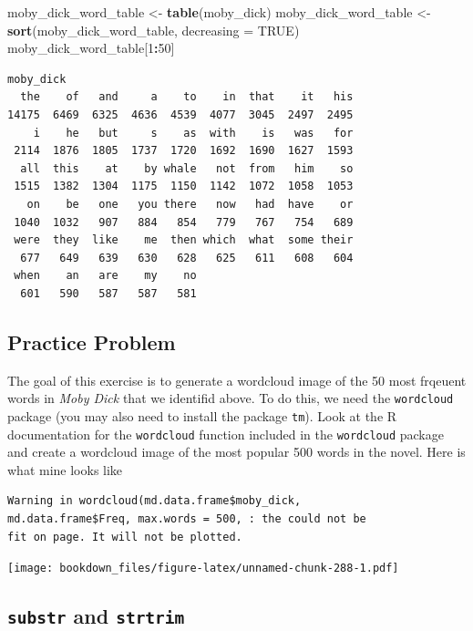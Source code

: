 \documentclass[
]{krantz}
\makeatletter
\newenvironment{Shaded}{\begin{snugshade}}{\end{snugshade}}
\newcommand{\DataTypeTok}[1]{\textcolor[rgb]{0.27,0.27,0.27}{#1}}
\newcommand{\DecValTok}[1]{\textcolor[rgb]{0.06,0.06,0.06}{#1}}
\newcommand{\KeywordTok}[1]{\textcolor[rgb]{0.27,0.27,0.27}{\textbf{#1}}}
\newcommand{\NormalTok}[1]{#1}
\newcommand{\OperatorTok}[1]{\textcolor[rgb]{0.43,0.43,0.43}{\textbf{#1}}}
\newcommand{\OtherTok}[1]{\textcolor[rgb]{0.37,0.37,0.37}{#1}}
\newcommand{\StringTok}[1]{\textcolor[rgb]{0.5,0.5,0.5}{#1}}
\newenvironment{kframe}{%
\medskip{}
\setlength{\fboxsep}{.8em}
 \def\at@end@of@kframe{}%
 \ifinner\ifhmode%
  \def\at@end@of@kframe{\end{minipage}}%
  \begin{minipage}{\columnwidth}%
 \fi\fi%
 \def\FrameCommand##1{\hskip\@totalleftmargin \hskip-\fboxsep
 \colorbox{shadecolor}{##1}\hskip-\fboxsep
     \hskip-\linewidth \hskip-\@totalleftmargin \hskip\columnwidth}%
 \MakeFramed {\advance\hsize-\width
   \@totalleftmargin\z@ \linewidth\hsize
   \@setminipage}}%
 {\par\unskip\endMakeFramed%
 \at@end@of@kframe}
\renewenvironment{Shaded}{\begin{kframe}}{\end{kframe}}
\makeatother
\begin{document}
\begin{Shaded}
\begin{Highlighting}[]
\NormalTok{moby\_dick\_word\_table \textless{}{-}}\StringTok{ }\KeywordTok{table}\NormalTok{(moby\_dick)}
\NormalTok{moby\_dick\_word\_table \textless{}{-}}\StringTok{ }\KeywordTok{sort}\NormalTok{(moby\_dick\_word\_table, }\DataTypeTok{decreasing =} \OtherTok{TRUE}\NormalTok{)}
\NormalTok{moby\_dick\_word\_table[}\DecValTok{1}\OperatorTok{:}\DecValTok{50}\NormalTok{]}
\end{Highlighting}
\end{Shaded}

\begin{verbatim}
moby_dick
  the    of   and     a    to    in  that    it   his 
14175  6469  6325  4636  4539  4077  3045  2497  2495 
    i    he   but     s    as  with    is   was   for 
 2114  1876  1805  1737  1720  1692  1690  1627  1593 
  all  this    at    by whale   not  from   him    so 
 1515  1382  1304  1175  1150  1142  1072  1058  1053 
   on    be   one   you there   now   had  have    or 
 1040  1032   907   884   854   779   767   754   689 
 were  they  like    me  then which  what  some their 
  677   649   639   630   628   625   611   608   604 
 when    an   are    my    no 
  601   590   587   587   581 
\end{verbatim}

\hypertarget{textPP2}{%
\subsection{Practice Problem}\label{textPP2}}

The goal of this exercise is to generate a wordcloud image of the 50 most frqeuent words in \emph{Moby Dick} that we identifid above. To do this, we need the \texttt{wordcloud} package (you may also need to install the package \texttt{tm}). Look at the R documentation for the \texttt{wordcloud} function included in the \texttt{wordcloud} package and create a wordcloud image of the most popular 500 words in the novel. Here is what mine looks like

\begin{verbatim}
Warning in wordcloud(md.data.frame$moby_dick,
md.data.frame$Freq, max.words = 500, : the could not be
fit on page. It will not be plotted.
\end{verbatim}

\texttt{[image: bookdown\_files/figure-latex/unnamed-chunk-288-1.pdf]}

\hypertarget{substr-and-strtrim}{%
\subsection{\texorpdfstring{\texttt{substr} and \texttt{strtrim}}{substr and strtrim}}\label{substr-and-strtrim}}
\end{document}
